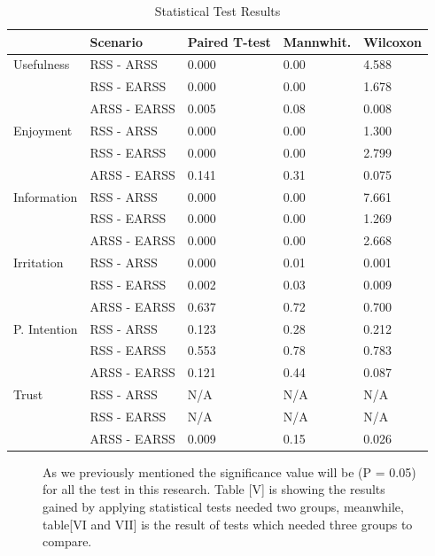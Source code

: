 \documentclass[letterpaper, 10 pt, conference]{ieeeconf}
\begin{document}
\begin{table}[h!]
\begin{tabular}{|l|l|l|l|l|}
\hline
             & Scenario     & Paired T-test & Mannwhit. & Wilcoxon \\ \hline
Usefulness   & RSS - ARSS   & 0.000         & 0.00          & 4.588    \\ \hline
             & RSS - EARSS  & 0.000         & 0.00          & 1.678    \\ \hline
             & ARSS - EARSS & 0.005         & 0.08          & 0.008    \\ \hline
Enjoyment    & RSS - ARSS   & 0.000         & 0.00          & 1.300    \\ \hline
             & RSS - EARSS  & 0.000         & 0.00          & 2.799    \\ \hline
             & ARSS - EARSS & 0.141         & 0.31          & 0.075    \\ \hline
Information  & RSS - ARSS   & 0.000         & 0.00          & 7.661    \\ \hline
             & RSS - EARSS  & 0.000         & 0.00          & 1.269    \\ \hline
             & ARSS - EARSS & 0.000         & 0.00          & 2.668    \\ \hline
Irritation   & RSS - ARSS   & 0.000         & 0.01          & 0.001    \\ \hline
             & RSS - EARSS  & 0.002         & 0.03          & 0.009    \\ \hline
             & ARSS - EARSS & 0.637         & 0.72          & 0.700    \\ \hline
P. Intention & RSS - ARSS   & 0.123         & 0.28          & 0.212    \\ \hline
             & RSS - EARSS  & 0.553         & 0.78          & 0.783    \\ \hline
             & ARSS - EARSS & 0.121         & 0.44          & 0.087    \\ \hline
Trust        & RSS - ARSS   & N/A           & N/A           & N/A      \\ \hline
             & RSS - EARSS  & N/A           & N/A           & N/A      \\ \hline
             & ARSS - EARSS & 0.009         & 0.15          & 0.026    \\ \hline
\end{tabular}
\caption{\label{table}Statistical Test Results}
\end{table}
\begin{figure}[h!]
As we previously mentioned the significance value will be (P = 0.05) for all the test in this research. Table [V] is showing the results gained by applying statistical tests needed two groups, meanwhile, table[VI and VII] is the result of tests which needed three groups to compare.
\end{figure}
\end{document}
